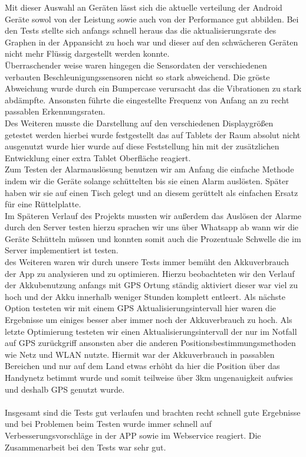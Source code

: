 Mit dieser Auswahl an Geräten lässt sich die aktuelle verteilung der Android Geräte sowol von der Leistung sowie auch von der Performance gut abbilden. Bei den Tests stellte sich anfangs schnell heraus das die aktualisierungsrate des Graphen in der Appansicht zu hoch war und dieser auf den schwächeren Geräten nicht mehr Flüssig dargestellt werden konnte.\\
Überraschender  weise waren hingegen die Sensordaten der verschiedenen verbauten Beschleunigungssensoren nicht so stark abweichend. Die gröste Abweichung wurde durch ein Bumpercase verursacht das die Vibrationen zu stark abdämpfte. Ansonsten führte die eingestellte Frequenz von Anfang an zu recht passablen Erkennungsraten.\\
Des Weiteren musste die Darstellung auf den verschiedenen Displaygrößen getestet werden hierbei wurde festgestellt das auf Tablets der Raum absolut nicht ausgenutzt wurde hier wurde auf diese Feststellung hin mit der zusätzlichen Entwicklung einer extra Tablet Oberfläche reagiert.\\
Zum Testen der Alarmauslösung benutzen wir am Anfang die einfache Methode indem wir die Geräte solange schüttelten bis sie einen Alarm auslösten. Später haben wir sie auf einen Tisch gelegt und an diesem gerüttelt als einfachen Ersatz für eine Rüttelplatte.\\
Im Späteren Verlauf des Projekts mussten wir außerdem das Auslösen der Alarme durch den Server testen hierzu sprachen wir uns über Whatsapp ab wann wir die Geräte Schütteln müssen und konnten somit auch die Prozentuale Schwelle die im Server implementiert ist testen.\\
des Weiteren waren wir durch unsere Tests immer bemüht den Akkuverbrauch der App zu analysieren und zu optimieren. Hierzu beobachteten wir den Verlauf der Akkubenutzung anfangs mit GPS Ortung ständig aktiviert dieser war viel zu hoch und der Akku innerhalb weniger Stunden komplett entleert. Als nächste Option testeten wir mit einem GPS Aktualisierungsintervall hier waren die Ergebnisse um einiges besser aber immer noch der Akkuverbrauch zu hoch. Als letzte Optimierung testeten wir einen Aktualisierungsintervall der nur im Notfall auf GPS zurückgriff ansonsten aber die anderen Positionsbestimmungsmethoden wie Netz und WLAN nutzte. Hiermit war der Akkuverbrauch in passablen Bereichen und nur auf dem Land etwas erhöht da hier die Position über das Handynetz betimmt wurde und somit teilweise über 3km ungenauigkeit aufwies und deshalb GPS genutzt wurde.\\
\\
Insgesamt sind die Tests gut verlaufen und brachten recht schnell gute Ergebnisse und bei Problemen beim Testen wurde immer schnell auf Verbesserungsvorschläge in der APP sowie im Webservice reagiert. Die Zusammenarbeit bei den Tests war sehr gut.